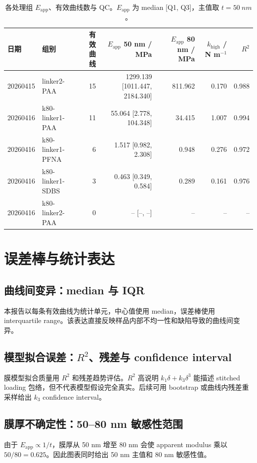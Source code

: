 \documentclass[UTF8,11pt,fontset=fandol]{ctexart}
\begin{document}
\begin{table}[htbp]
    \centering
    \caption{各处理组 $E_\mathrm{app}$、有效曲线数与 QC。$E_\mathrm{app}$ 为 median [Q1, Q3]，主值取 $t=\SI{50}{nm}$。}
    \label{tab:mechanics}
    \small
    \setlength{\tabcolsep}{3.5pt}
    \begin{tabularx}{\linewidth}{llrrrrr}
        \toprule
        日期 & 组别 & 有效曲线 & $E_\mathrm{app}$ 50 nm / MPa & $E_\mathrm{app}$ 80 nm / MPa & $k_\mathrm{high}$ / N m$^{-1}$ & $R^2$ \\
        \midrule
        20260415 & linker2-PAA & 15 & 1299.139 [1011.447, 2184.340] & 811.962 & 0.170 & 0.988 \\
20260416 & k80-linker1-PAA & 11 & 55.064 [2.778, 104.348] & 34.415 & 1.007 & 0.994 \\
20260416 & k80-linker1-PFNA & 6 & 1.517 [0.982, 2.308] & 0.948 & 0.276 & 0.972 \\
20260416 & k80-linker1-SDBS & 3 & 0.463 [0.349, 0.584] & 0.289 & 0.161 & 0.976 \\
20260416 & k80-linker2-PAA & 0 & -- [--, --] & -- & -- & -- \\
        \bottomrule
    \end{tabularx}
\end{table}

\section{误差棒与统计表达}
\subsection{曲线间变异：median 与 IQR}
本报告以每条有效曲线为统计单元，中心值使用 median，误差棒使用 interquartile range。该表达直接反映样品内部不均一性和缺陷导致的曲线间变异。

\subsection{模型拟合误差：$R^2$、残差与 confidence interval}
膜模型拟合质量用 $R^2$ 和残差趋势评估。$R^2$ 高说明 $k_1\delta+k_3\delta^3$ 能描述 stitched loading 包络，但不代表模型假设完全真实。后续可用 bootstrap 或曲线内残差重采样给出 $k_3$ confidence interval。

\subsection{膜厚不确定性：50--80 nm 敏感性范围}
由于 $E_\mathrm{app}\propto 1/t$，膜厚从 50 nm 增至 80 nm 会使 apparent modulus 乘以 $50/80=0.625$。因此图表同时给出 50 nm 主值和 80 nm 敏感性值。
\end{document}
